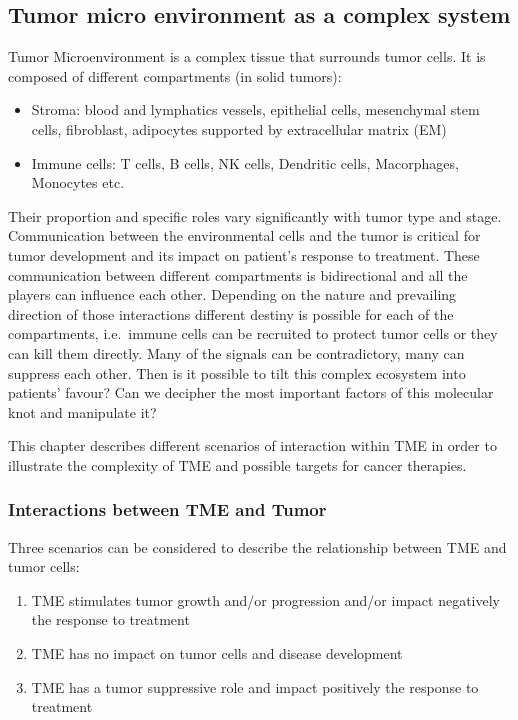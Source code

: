 \documentclass[12pt,]{book}
\providecommand{\tightlist}{%
  \setlength{\itemsep}{0pt}\setlength{\parskip}{0pt}}
\theoremstyle{definition}
\theoremstyle{definition}
\theoremstyle{definition}
\theoremstyle{remark}
\begin{document}
\hypertarget{tumor-micro-environment-as-a-complex-system}{%
\subsection{Tumor micro environment as a complex
system}\label{tumor-micro-environment-as-a-complex-system}}

Tumor Microenvironment is a complex tissue that surrounds tumor cells.
It is composed of different compartments (in solid tumors):

\begin{itemize}
\tightlist
\item
  Stroma: blood and lymphatics vessels, epithelial cells, mesenchymal
  stem cells, fibroblast, adipocytes supported by extracellular matrix
  (EM)
\item
  Immune cells: T cells, B cells, NK cells, Dendritic cells,
  Macorphages, Monocytes etc.
\end{itemize}

Their proportion and specific roles vary significantly with tumor type
and stage. Communication between the environmental cells and the tumor
is critical for tumor development and its impact on patient's response
to treatment. These communication between different compartments is
bidirectional and all the players can influence each other. Depending on
the nature and prevailing direction of those interactions different
destiny is possible for each of the compartments, i.e.~immune cells can
be recruited to protect tumor cells or they can kill them directly. Many
of the signals can be contradictory, many can suppress each other. Then
is it possible to tilt this complex ecosystem into patients' favour? Can
we decipher the most important factors of this molecular knot and
manipulate it?

This chapter describes different scenarios of interaction within TME in
order to illustrate the complexity of TME and possible targets for
cancer therapies.

\hypertarget{interactions-between-tme-and-tumor}{%
\subsubsection{Interactions between TME and
Tumor}\label{interactions-between-tme-and-tumor}}

Three scenarios can be considered to describe the relationship between
TME and tumor cells:

\begin{enumerate}
\def\labelenumi{\arabic{enumi}.}
\tightlist
\item
  TME stimulates tumor growth and/or progression and/or impact
  negatively the response to treatment
\item
  TME has no impact on tumor cells and disease development
\item
  TME has a tumor suppressive role and impact positively the response to
  treatment
\end{enumerate}
\end{document}
